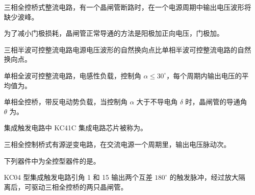 \documentclass[电力电子]{subfiles}
\begin{document}
\begin{ti}
	三相全控桥式整流电路，有一个晶闸管断路时，在一个电源周期中输出电压波形将缺少波峰。
\end{ti}

\begin{ti}
	为了减小门极损耗，晶闸管正常导通的方法是阳极加正向电压，门极加。
\end{ti}

\begin{ti}
	三相半波可控整流电路电源电压波形的自然换向点比单相半波可控整流电路的自然换向点。
\end{ti}

\begin{ti}
	单相全波可控整流电路，电感性负载，控制角 $\alpha \leq 30^\circ$，每个周期内输出电压的平均值为。
\end{ti}

\begin{ti}
	单相全控桥，带反电动势负载，当控制角 $\alpha$ 大于不导电角 $\delta$ 时，晶闸管的导通角 $\theta$ 为。
	\fourch{$\uppi - \alpha - \delta$}{$\uppi - \alpha + \delta$}{$\uppi - 2\alpha$}{$\uppi - 2\delta$}
\end{ti}

\begin{ti}
	集成触发电路中 KC41C 集成电路芯片被称为。
\end{ti}

\begin{ti}
	三相全控制桥式有源逆变电路，在交流电源一个周期里，输出电压脉动次。
\end{ti}

\begin{ti}
	下列器件中为全控型器件的是。
\end{ti}

\begin{ti}
	KC04 型集成触发电路引角 1 和 15 输出两个互差 $180^\circ$ 的触发脉冲，经过放大隔离后，可驱动三相全控桥的两只晶闸管。
\end{ti}
\end{document}
